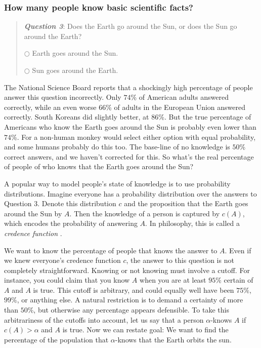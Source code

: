 \subsubsection{How many people know basic scientific facts?}
\begin{quote}
\textbf{\emph{Question 3}}: Does the Earth go around the Sun, or does
the Sun go around the Earth?

\medskip

$\bigcirc$ Earth goes around the Sun.

$\bigcirc$ Sun goes around the Earth.
\end{quote}
The National Science Board \citeyear[Table 7-8]{National_Science_Board2014-yl}
reports that a shockingly high percentage of people answer this question incorrectly. Only $74$\% of American adults answered correctly, while an even worse $66$\% of adults in the European Union answered correctly. South Koreans did slightly better, at $86$\%. But the true percentage of Americans who know the Earth goes around the Sun is probably even lower than $74$\%. For a non-human monkey would select either option with equal probability, and some humans probably do this too. The base-line of no knowledge is $50$\% correct answers, and we haven't corrected for this. So what's the real percentage of people of who knows that the Earth goes around the Sun? 

A popular way to model people's state of knowledge is to use probability distributions. Imagine everyone has a probability distribution over the answers to Question 3. Denote this distribution $c$ and the proposition that the Earth goes around the Sun by $A$. Then the knowledge of a person is captured by $c(A)$, which encodes the probability of answering $A$. In philosophy, this is called a \emph{credence function} \parencite{Pettigrew2019-rk}.

We want to know the percentage of people that knows the answer to $A$. Even if we knew everyone's credence function $c$, the answer to this question is not completely straightforward. Knowing or not knowing must involve a cutoff. For instance, you could claim that you know $A$ when you are at least $95\%$ certain of $A$ and $A$ is true. This cutoff is arbitrary, and could equally well have been $75\%$, $99\%$, or anything else. A natural restriction is to demand a certainty of more than $50\%$, but otherwise any percentage appears defensible. To take this arbitrariness of the cutoffs into account, let us say that a person $\alpha$-knows $A$ if $c(A)>\alpha$ and $A$ is true. Now we can restate goal: We want to find the percentage of the population that $\alpha$-knows that the Earth orbits the sun.

